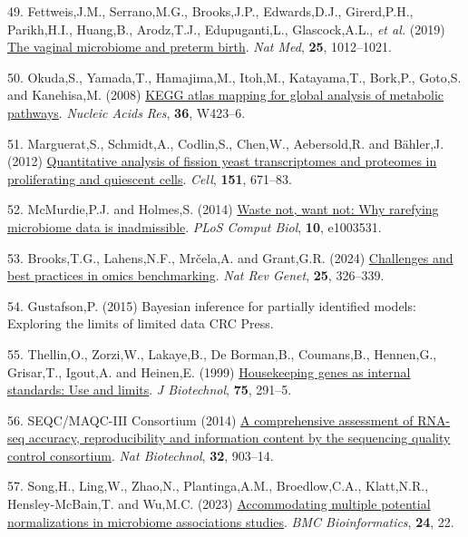 \documentclass[
]{article}
\newlength{\cslhangindent}
\newenvironment{CSLReferences}[2] %
 {\begin{list}{}{%
  \setlength{\itemindent}{0pt}
  \setlength{\leftmargin}{0pt}
  \setlength{\parsep}{0pt}
  \ifodd #1
   \setlength{\leftmargin}{\cslhangindent}
   \setlength{\itemindent}{-1\cslhangindent}
  \fi
  \setlength{\itemsep}{#2\baselineskip}}}
 {\end{list}}
\begin{document}
\begin{CSLReferences}{1}{1}
49. Fettweis,J.M., Serrano,M.G., Brooks,J.P., Edwards,D.J., Girerd,P.H.,
Parikh,H.I., Huang,B., Arodz,T.J., Edupuganti,L., Glascock,A.L.,
\emph{et al.} (2019)
\href{https://doi.org/10.1038/s41591-019-0450-2}{The vaginal microbiome
and preterm birth}. \emph{Nat Med}, \textbf{25}, 1012--1021.

50. Okuda,S., Yamada,T., Hamajima,M., Itoh,M., Katayama,T., Bork,P.,
Goto,S. and Kanehisa,M. (2008)
\href{https://doi.org/10.1093/nar/gkn282}{KEGG atlas mapping for global
analysis of metabolic pathways}. \emph{Nucleic Acids Res}, \textbf{36},
W423--6.

51. Marguerat,S., Schmidt,A., Codlin,S., Chen,W., Aebersold,R. and
Bähler,J. (2012)
\href{https://doi.org/10.1016/j.cell.2012.09.019}{Quantitative analysis
of fission yeast transcriptomes and proteomes in proliferating and
quiescent cells}. \emph{Cell}, \textbf{151}, 671--83.

52. McMurdie,P.J. and Holmes,S. (2014)
\href{https://doi.org/10.1371/journal.pcbi.1003531}{Waste not, want not:
Why rarefying microbiome data is inadmissible}. \emph{PLoS Comput Biol},
\textbf{10}, e1003531.

53. Brooks,T.G., Lahens,N.F., Mrčela,A. and Grant,G.R. (2024)
\href{https://doi.org/10.1038/s41576-023-00679-6}{Challenges and best
practices in omics benchmarking}. \emph{Nat Rev Genet}, \textbf{25},
326--339.

54. Gustafson,P. (2015) Bayesian inference for partially identified
models: Exploring the limits of limited data CRC Press.

55. Thellin,O., Zorzi,W., Lakaye,B., De Borman,B., Coumans,B.,
Hennen,G., Grisar,T., Igout,A. and Heinen,E. (1999)
\href{https://www.ncbi.nlm.nih.gov/pubmed/10617337}{Housekeeping genes
as internal standards: Use and limits}. \emph{J Biotechnol},
\textbf{75}, 291--5.

56. SEQC/MAQC-III Consortium (2014)
\href{https://doi.org/10.1038/nbt.2957}{A comprehensive assessment of
RNA-seq accuracy, reproducibility and information content by the
sequencing quality control consortium}. \emph{Nat Biotechnol},
\textbf{32}, 903--14.

57. Song,H., Ling,W., Zhao,N., Plantinga,A.M., Broedlow,C.A.,
Klatt,N.R., Hensley-McBain,T. and Wu,M.C. (2023)
\href{https://doi.org/10.1186/s12859-023-05147-w}{Accommodating multiple
potential normalizations in microbiome associations studies}. \emph{BMC
Bioinformatics}, \textbf{24}, 22.

\end{CSLReferences}
\end{document}
